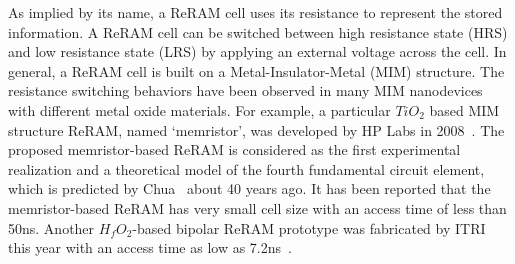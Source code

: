 
As implied by its name, a ReRAM cell uses its resistance to represent the
stored information. A ReRAM cell can be switched between high resistance
state (HRS) and low resistance state (LRS) by applying an external voltage
across the cell.
In general, a ReRAM cell is built on a Metal-Insulator-Metal (MIM)
structure. The resistance switching behaviors have been observed in many
MIM nanodevices with different metal oxide materials. For example, a
particular $TiO_2$ based MIM structure ReRAM, named `memristor', was
developed by HP Labs in 2008~\cite{memristor:missing}. The proposed
memristor-based ReRAM is considered as the first experimental realization
and a theoretical model of the fourth fundamental circuit element, which
is predicted by Chua~\cite{memristor:chua} about 40 years ago. It has been
reported that the memristor-based ReRAM has very small cell size with an
access time of less than 50ns.
Another $H_fO_2$-based bipolar ReRAM prototype was fabricated by ITRI this year
with an access time as low as 7.2ns~\cite{ReRAM_ISSCC2011_Sheu}.

